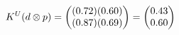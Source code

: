 \documentclass[preview]{standalone}
\begin{document}
\begin{align*}
\special{dvisvgm:raw <g id='unique000'>}K^U(d \otimes p) = \begin{pmatrix} (0.72)(0.60) \\ (0.87)(0.69) \end{pmatrix} = \begin{pmatrix} 0.43 \\ 0.60 \end{pmatrix}\special{dvisvgm:raw </g>}
\end{align*}
\end{document}
